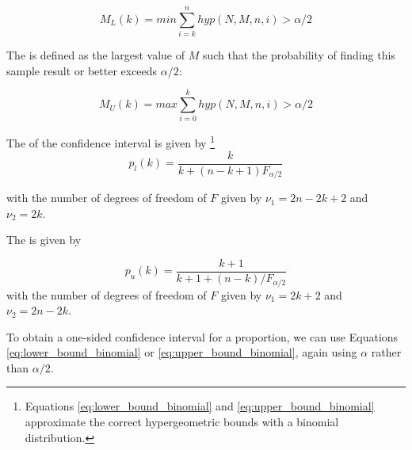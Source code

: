 \begin{equation}
  M_L(k) = min{\sum_{i=k}^n hyp(N, M, n, i) > \alpha /2}
\end{equation}

The  is defined as the largest value of $M$ such that the probability of finding this sample result or better exceeds $\alpha/2$:

\begin{equation}
  M_U(k) = max{\sum_{i=0}^k hyp(N, M, n, i) > \alpha /2}
  \label{eq:upper_bound}
\end{equation}

The  of the confidence interval is given by
\footnote{Equations \ref{eq:lower_bound_binomial} and \ref{eq:upper_bound_binomial} approximate the correct hypergeometric bounds with a binomial distribution.}
\begin{equation}
  p_l(k) = \frac{k}{k + (n - k + 1) F_{\alpha/2}}
\label{eq:lower_bound_binomial}
\end{equation}

with the number of degrees of freedom of $F$ given by $\nu_1 = 2n - 2k + 2$ and $\nu_2 = 2k$.

The  is given by

\begin{equation}
  p_u(k) = \frac{k + 1}{k + 1 + (n - k)/F_{\alpha/2}}
\label{eq:upper_bound_binomial}
\end{equation}
with the number of degrees of freedom of $F$ given by $\nu_1 = 2k + 2$ and $\nu_2 = 2n - 2k$.

\bigskip


To obtain a one-sided confidence interval for a proportion, we can use Equations \ref{eq:lower_bound_binomial} or \ref{eq:upper_bound_binomial}, again using $\alpha$ rather than $\alpha/2$.


